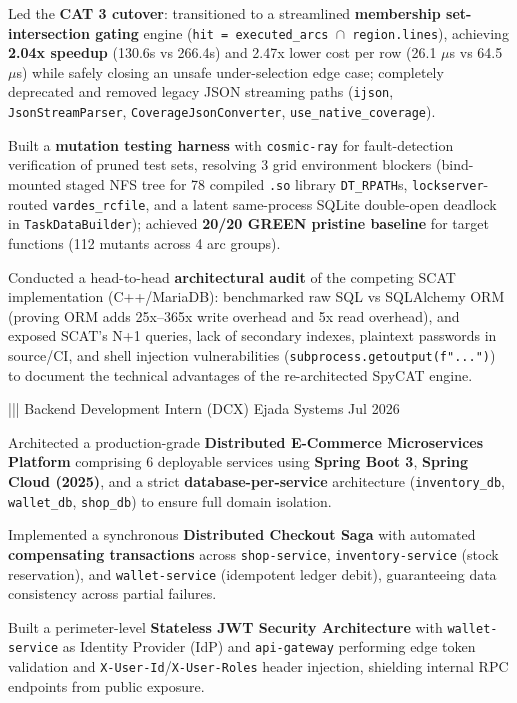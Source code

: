 {{        \item Led the \textbf{CAT 3 cutover}: transitioned to a streamlined \textbf{membership set-intersection gating} engine (\texttt{hit = executed\_arcs $\cap$ region.lines}), achieving \textbf{2.04x speedup} (130.6s vs 266.4s) and 2.47x lower cost per row (26.1 $\mu$s vs 64.5 $\mu$s) while safely closing an unsafe under-selection edge case; completely deprecated and removed legacy JSON streaming paths (\texttt{ijson}, \texttt{JsonStreamParser}, \texttt{CoverageJsonConverter}, \texttt{use\_native\_coverage}).
        \item Built a \textbf{mutation testing harness} with \texttt{cosmic-ray} for fault-detection verification of pruned test sets, resolving 3 grid environment blockers (bind-mounted staged NFS tree for 78 compiled \texttt{.so} library \texttt{DT\_RPATH}s, \texttt{lockserver}-routed \texttt{vardes\_rcfile}, and a latent same-process SQLite double-open deadlock in \texttt{TaskDataBuilder}); achieved \textbf{20/20 GREEN pristine baseline} for target functions (112 mutants across 4 arc groups).
        \item Conducted a head-to-head \textbf{architectural audit} of the competing SCAT implementation (C++/MariaDB): benchmarked raw SQL vs SQLAlchemy ORM (proving ORM adds 25x--365x write overhead and 5x read overhead), and exposed SCAT's N+1 queries, lack of secondary indexes, plaintext passwords in source/CI, and shell injection vulnerabilities (\texttt{subprocess.getoutput(f"...")}) to document the technical advantages of the re-architected SpyCAT engine.
    }%
    |||
    {Backend Development Intern (DCX)}%
    {Ejada Systems}%
    {Jul 2026}%
    {%
        \item Architected a production-grade \textbf{Distributed E-Commerce Microservices Platform} comprising 6 deployable services using \textbf{Spring Boot 3}, \textbf{Spring Cloud (2025)}, and a strict \textbf{database-per-service} architecture (\texttt{inventory\_db}, \texttt{wallet\_db}, \texttt{shop\_db}) to ensure full domain isolation.
        \item Implemented a synchronous \textbf{Distributed Checkout Saga} with automated \textbf{compensating transactions} across \texttt{shop-service}, \texttt{inventory-service} (stock reservation), and \texttt{wallet-service} (idempotent ledger debit), guaranteeing data consistency across partial failures.
        \item Built a perimeter-level \textbf{Stateless JWT Security Architecture} with \texttt{wallet-service} as Identity Provider (IdP) and \texttt{api-gateway} performing edge token validation and \texttt{X-User-Id}/\texttt{X-User-Roles} header injection, shielding internal RPC endpoints from public exposure.
}}
